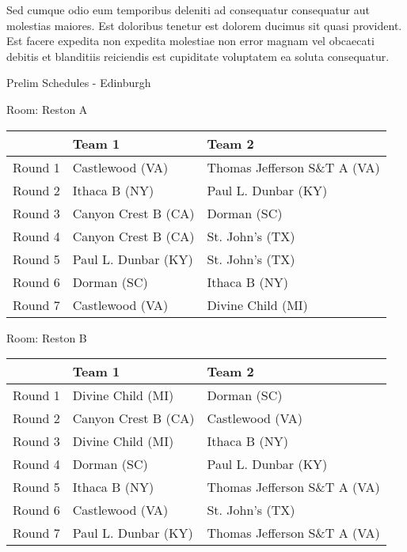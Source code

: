\documentclass{article}%
\begin{document}
\newline%
Sed cumque odio eum temporibus deleniti ad consequatur consequatur aut molestias maiores. Est doloribus tenetur est dolorem ducimus sit quasi provident. Est facere expedita non expedita molestiae non error magnam vel obcaecati debitis et blanditiis reiciendis est cupiditate voluptatem ea soluta consequatur.%
\newpage%
\begin{center}%
\begin{Huge}%
Prelim Schedules {-} Edinburgh%
\end{Huge}%
\end{center}%
\begin{flushleft}%
\begin{Large}%
Room: Reston A%
\end{Large}%
\end{flushleft}%
\begin{tabularx}{\textwidth}{|c|Y|Y|}%
\hline%
&Team 1&Team 2\\%
\hline%
Round 1&Castlewood (VA)&Thomas Jefferson S\&T A (VA)\\%
Round 2&Ithaca B (NY)&Paul L. Dunbar (KY)\\%
Round 3&Canyon Crest B (CA)&Dorman (SC)\\%
Round 4&Canyon Crest B (CA)&St. John's (TX)\\%
Round 5&Paul L. Dunbar (KY)&St. John's (TX)\\%
Round 6&Dorman (SC)&Ithaca B (NY)\\%
Round 7&Castlewood (VA)&Divine Child (MI)\\%
\hline%
\end{tabularx}%
\vspace*{8pt}%
\linebreak%
\begin{flushleft}%
\begin{Large}%
Room: Reston B%
\end{Large}%
\end{flushleft}%
\begin{tabularx}{\textwidth}{|c|Y|Y|}%
\hline%
&Team 1&Team 2\\%
\hline%
Round 1&Divine Child (MI)&Dorman (SC)\\%
Round 2&Canyon Crest B (CA)&Castlewood (VA)\\%
Round 3&Divine Child (MI)&Ithaca B (NY)\\%
Round 4&Dorman (SC)&Paul L. Dunbar (KY)\\%
Round 5&Ithaca B (NY)&Thomas Jefferson S\&T A (VA)\\%
Round 6&Castlewood (VA)&St. John's (TX)\\%
Round 7&Paul L. Dunbar (KY)&Thomas Jefferson S\&T A (VA)\\%
\hline%
\end{tabularx}%
\end{document}
